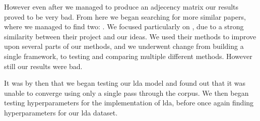 However even after we managed to produce an adjecency matrix our results proved to be very bad.
From here we began searching for more similar papers, where we managed to find two: .
We focused particularly on , due to a strong similarity between their project and our ideas.
We used their methods to improve upon several parts of our methods, and we underwent change from building a single framework, to testing and comparing multiple different methods. However still our results were bad.

It was by then that we began testing our lda model and found out that it was unable to converge using only a single pass through the corpus. We then began testing hyperparameters for the implementation of lda, before once again finding hyperparameters for our lda dataset.
